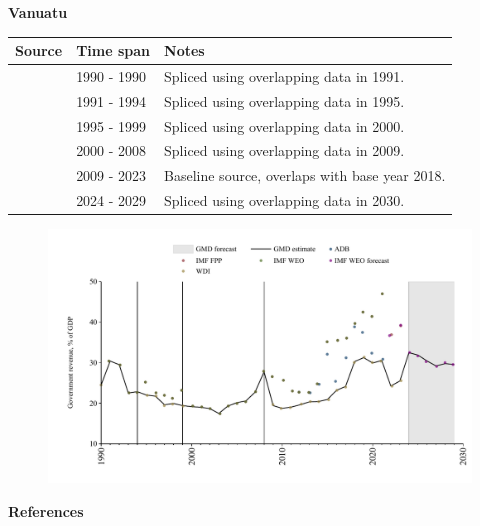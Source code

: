 \documentclass[12pt,a4paper,landscape]{article}
\begin{document}
\begin{adjustbox}{max totalsize={\paperwidth}{\paperheight},center}
\begin{minipage}[t][\textheight][t]{\textwidth}
\vspace*{0.5cm}
{}
\begin{center}
{\Large\bfseries Vanuatu}
\end{center}
\vspace{0.5cm}
\begin{table}[H]
\centering
\small
\begin{tabular}{|l|l|l|}
\hline
\textbf{Source} & \textbf{Time span} & \textbf{Notes} \\
\hline
\rowcolor{white}\cite{WDI}& 1990 - 1990 &Spliced using overlapping data in 1991.\\
\rowcolor{lightgray}\cite{IMF_WEO}& 1991 - 1994 &Spliced using overlapping data in 1995.\\
\rowcolor{white}\cite{WDI}& 1995 - 1999 &Spliced using overlapping data in 2000.\\
\rowcolor{lightgray}\cite{IMF_WEO}& 2000 - 2008 &Spliced using overlapping data in 2009.\\
\rowcolor{white}\cite{WDI}& 2009 - 2023 &Baseline source, overlaps with base year 2018.\\
\rowcolor{lightgray}\cite{IMF_WEO_forecast}& 2024 - 2029 &Spliced using overlapping data in 2030.\\
\hline
\end{tabular}
\end{table}
\begin{figure}[H]
\centering
\includegraphics[width=\textwidth,height=0.6\textheight,keepaspectratio]{graphs/VUT_govrev_GDP.pdf}
\end{figure}
\end{minipage}
\end{adjustbox}
{}
\begin{center}
{\Large\bfseries References}
\end{center}
\small


\end{document}
